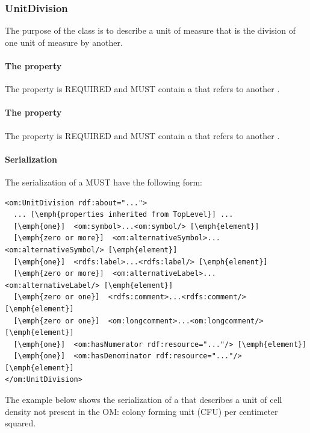 \subsubsection{UnitDivision}
\label{sec:UnitDivision}

The purpose of the  class is to describe a unit of measure that is the division of one unit of measure by another.

\paragraph{The  property}\label{sec:hasNumerator}
The  property is REQUIRED and MUST contain a  that refers to another .

\paragraph{The  property}\label{sec:hasDenominator}
The  property is REQUIRED and MUST contain a  that refers to another .

\paragraph{Serialization}
The serialization of a  MUST have the following form:


\begin{lstlisting}
<om:UnitDivision rdf:about="...">
  ... [\emph{properties inherited from TopLevel}] ...
  [\emph{one}]  <om:symbol>...<om:symbol/> [\emph{element}]
  [\emph{zero or more}]  <om:alternativeSymbol>...<om:alternativeSymbol/> [\emph{element}]
  [\emph{one}]  <rdfs:label>...<rdfs:label/> [\emph{element}]
  [\emph{zero or more}]  <om:alternativeLabel>...<om:alternativeLabel/> [\emph{element}]
  [\emph{zero or one}]  <rdfs:comment>...<rdfs:comment/> [\emph{element}]
  [\emph{zero or one}]  <om:longcomment>...<om:longcomment/> [\emph{element}]
  [\emph{one}]  <om:hasNumerator rdf:resource="..."/> [\emph{element}]
  [\emph{one}]  <om:hasDenominator rdf:resource="..."/> [\emph{element}]
</om:UnitDivision>
\end{lstlisting}


The example below shows the serialization of a  that describes a unit of cell density not present in the OM: colony forming unit (CFU) per centimeter squared.

